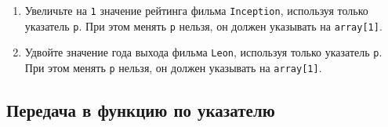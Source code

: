 \documentclass{article}
\begin{document}
\begin{enumerate}
\begin{enumerate}
\item Увеличьте на \texttt{1} значение рейтинга фильма \texttt{Inception}, используя только указатель \texttt{p}. При этом менять \texttt{p} нельзя, он  должен указывать на \texttt{array[1]}.
\item Удвойте значение года выхода фильма \texttt{Leon}, используя только указатель \texttt{p}. При этом менять \texttt{p} нельзя, он  должен указывать на \texttt{array[1]}.
\end{enumerate}

\end{enumerate}

\newpage
\subsection{Передача в функцию по указателю}
\end{document}
